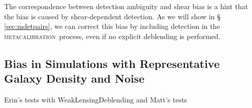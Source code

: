 \documentclass[fleqn,useAMS,usenatbib]{mnras}
\newcommand{\mcal}{\textsc{metacalibration}}
\begin{document}
The correspondence between detection ambiguity and shear bias is a hint that
the bias is caused by shear-dependent detection. As we will show in \S
\ref{sec:mdetpairs}, we can correct this bias by including detection in the
\mcal\ process, even if no explicit deblending is performed.

\subsection{Bias in Simulations with Representative Galaxy Density and Noise}

Erin's tests with WeakLensingDeblending and Matt's tests





\end{document}
